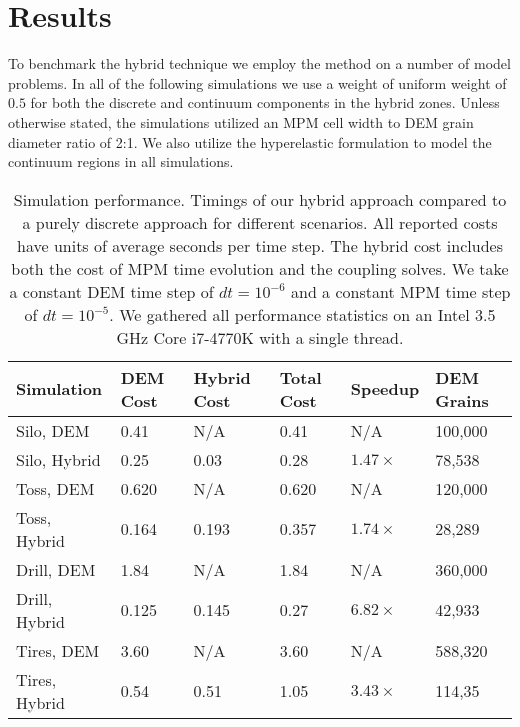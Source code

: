 \chapter{Results} \label{sec:results}
To benchmark the hybrid technique we employ the method on a number of model problems. In all of the following simulations we use a weight of uniform weight of $0.5$ for both the discrete and continuum components in the hybrid zones. Unless otherwise stated, the simulations utilized an MPM cell width to DEM grain diameter ratio of 2:1. We also utilize the hyperelastic formulation to model the continuum regions in all simulations. 

\begin{table}[!htb]
  \begin{tabular}{llllll}
      \hline
      \textbf{Simulation} & \textbf{DEM Cost} & \textbf{Hybrid Cost} & \textbf{Total Cost} & \textbf{Speedup} & \textbf{DEM Grains}\\
      \hline
      Silo, DEM    & 0.41 & N/A & 0.41 & N/A  & 100,000\\
      Silo, Hybrid & 0.25 & 0.03 & 0.28 & $1.47\times$ & 78,538\\
      \hline
      Toss, DEM    & 0.620 & N/A & 0.620 & N/A  & 120,000\\
      Toss, Hybrid & 0.164 & 0.193 & 0.357 & $1.74\times$ & 28,289\\
      \hline
      Drill, DEM    & 1.84  & N/A  & 1.84  & N/A & 360,000\\
      Drill, Hybrid & 0.125 & 0.145 & 0.27 & $6.82\times$ & 42,933\\
      \hline
      Tires, DEM    & 3.60 & N/A & 3.60 & N/A  & 588,320\\
      Tires, Hybrid & 0.54 & 0.51 & 1.05 & $3.43\times$ & 114,35\\
      \hline
  \end{tabular}
  \vspace{0.2cm}
  \caption{Simulation performance. Timings of our hybrid approach compared to a purely discrete approach for different scenarios. All reported costs have units of average seconds per time step. The hybrid cost includes both the cost of MPM time evolution and the coupling solves. We take a constant DEM time step of $dt=10^{-6}$ and a constant MPM time step of $dt=10^{-5}$. We gathered all performance statistics on an Intel 3.5 GHz Core i7-4770K with a single thread.} \label{tbl:speedup}
\end{table}

